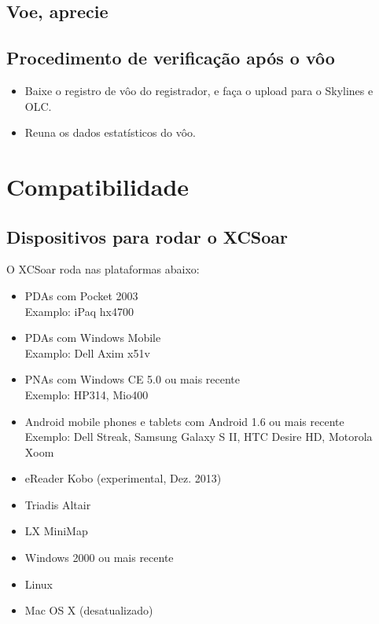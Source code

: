 \subsection*{Voe, aprecie}
\vspace{4em}

\subsection*{Procedimento de verificação após o vôo}
\begin{itemize}
\item Baixe o registro de vôo do registrador, e faça o upload para o Skylines e OLC.
\item Reuna os dados estatísticos do vôo.
\end{itemize}
\newpage




\section{Compatibilidade}

\subsection*{Dispositivos para rodar o XCSoar}

O XCSoar roda nas plataformas abaixo:

\begin{itemize}
\item PDAs com Pocket 2003 \\
  Examplo: iPaq hx4700
\item PDAs com Windows Mobile \\
  Examplo: Dell Axim x51v
\item PNAs com Windows CE 5.0 ou mais recente \\
  Exemplo: HP314, Mio400
  \item Android mobile phones e tablets com Android 1.6 ou mais recente \\
  Exemplo: Dell Streak, Samsung Galaxy S II, HTC Desire HD,
  Motorola Xoom
\item eReader Kobo (experimental, Dez. 2013)
\item Triadis Altair
\item LX MiniMap
\item Windows 2000 ou mais recente
\item Linux
\item Mac OS X (desatualizado)
\end{itemize}

